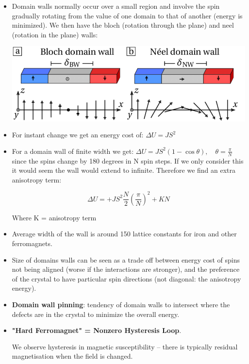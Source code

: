 \begin{itemize}
    \item Domain walls normally occur over a small region and involve the spin gradually rotating from the value of one domain to that of another (energy is minimized). We then have the bloch (rotation through the plane) and neel (rotation in the plane) walls:
    
    \includegraphics[width = 0.9\linewidth]{Images/domain walls.png}
    
    \item For instant change we get an energy cost of: $\Delta U = JS^2 $
    
    \item For a domain wall of finite width we get: $\Delta U = JS^2 (1- \cos\theta), \quad \theta = \frac{\pi}{N}$ since the spins change by 180 degrees in N spin steps. If we only consider this it would seem the wall would extend to infinite. Therefore we find an extra anisotropy term:
    
    \[ \Delta U = +JS^2 \frac{N}{2} \left( \frac{\pi}{N} \right)^2 + KN \]
    
    Where K = anisotropy term
    \item Average width of the wall is around 150 lattice constants for iron and other ferromagnets.
    
    \item Size of domains walls can be seen as a trade off between energy cost of spins not being aligned (worse if the interactions are stronger), and the preference of the crystal to have particular spin directions (not diagonal: the anisotropy energy).
    
    \item \textbf{Domain wall pinning}: tendency of domain walls to intersect where the defects are in the crystal to minimize the overall energy.
    
    \item \textbf{"Hard Ferromagnet" = Nonzero Hysteresis Loop}.
    
    We observe hysteresis in magnetic susceptibility -- there is typically residual magnetisation when the field is changed.
    

\end{itemize}
